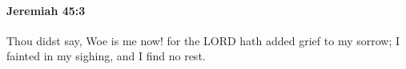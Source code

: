 
		\paragraph{Jeremiah 45:3} %
			\label{JEREMIAH-45-3}

			Thou didst say, Woe is me now! for the LORD hath added grief to my sorrow; I fainted in my sighing, and I find no rest.


